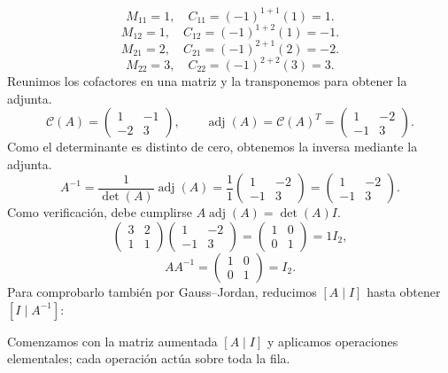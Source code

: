\documentclass[12pt]{article}
\newcommand{\adj}{\operatorname{adj}}
\begin{document}
\[
M_{11}=1,\quad C_{11}=(-1)^{1+1}(1)=1.
\]
\[
M_{12}=1,\quad C_{12}=(-1)^{1+2}(1)=-1.
\]
\[
M_{21}=2,\quad C_{21}=(-1)^{2+1}(2)=-2.
\]
\[
M_{22}=3,\quad C_{22}=(-1)^{2+2}(3)=3.
\]
Reunimos los cofactores en una matriz y la transponemos para obtener la adjunta.
\[
\mathcal{C}(A)=\begin{pmatrix}1&-1\\-2&3\end{pmatrix},\qquad\adj(A)=\mathcal{C}(A)^T=\begin{pmatrix}1&-2\\-1&3\end{pmatrix}.
\]
Como el determinante es distinto de cero, obtenemos la inversa mediante la adjunta.
\[
A^{-1}=\frac1{\det(A)}\adj(A)=\frac1{1}\begin{pmatrix}1&-2\\-1&3\end{pmatrix}=\begin{pmatrix}1&-2\\-1&3\end{pmatrix}.
\]
Como verificación, debe cumplirse $A\adj(A)=\det(A)I$.
\[
\begin{pmatrix}3&2\\1&1\end{pmatrix}\begin{pmatrix}1&-2\\-1&3\end{pmatrix}=\begin{pmatrix}1&0\\0&1\end{pmatrix}=1I_{2},
\]
\[
AA^{-1}=\begin{pmatrix}1&0\\0&1\end{pmatrix}=I_{2}.
\]
Para comprobarlo también por Gauss--Jordan, reducimos $[A\mid I]$ hasta obtener $[I\mid A^{-1}]$:

Comenzamos con la matriz aumentada $[A\mid I]$ y aplicamos operaciones elementales; cada operación actúa sobre toda la fila.
\end{document}
